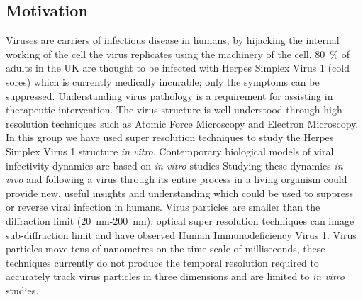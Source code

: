 \subsection{Motivation}
Viruses are carriers of infectious disease in humans, by hijacking the internal working of the cell the virus replicates using the machinery of the cell.
\SI{80}{\percent} of adults in the UK are thought to be infected with Herpes Simplex Virus 1 (cold sores) which is currently medically incurable\cite{Herpes}; only the symptoms can be suppressed.
Understanding virus pathology is a requirement for assisting in therapeutic intervention.
The virus structure is well understood through high resolution techniques such as Atomic Force Microscopy and Electron Microscopy.
In this group we have used super resolution techniques to study the Herpes Simplex Virus 1 structure \textit{in vitro}\cite{Laine2015}.
Contemporary biological models of viral infectivity dynamics are based on \textit{in vitro} studies %
Studying these dynamics \textit{in vivo} and following a virus through its entire process in a living organism could provide new, useful insights and understanding which could be used to suppress or reverse viral infection in humans.
Virus particles are smaller than the diffraction limit  (\SI{20}{\nano\meter}-\SI{200}{\nano\meter}); optical super resolution techniques can image sub-diffraction limit and have observed Human Immunodeficiency Virus 1\cite{Pereira2012}.
Virus particles move tens of nanometres on the time scale of milliseconds\cite{Brandenburg2007}, these techniques currently do not produce the temporal resolution required to accurately track virus particles\cite{Brandenburg2007} in three dimensions and are limited to \textit{in vitro} studies.
%
